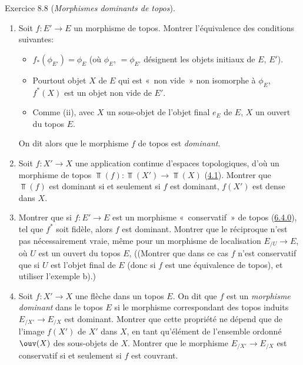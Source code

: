 \begin{enonce*}[remark]{Exercice 8.8}
(\emph{Morphismes dominants de topos}).
\begin{enumerate}
\renewcommand{\theenumi}{\alph{enumi}}
\renewcommand{\labelenumi}{\theenumi)}
\item Soit $f:E'\rightarrow E$ un morphisme de topos. Montrer
l'équivalence des conditions suivantes:

\begin{itemize}
\item[(i)] $f_{\ast}(\phi_{E'})=\phi_E$ (où $\phi_E$, $=\phi_{E'}$
désignent les objets initiaux de $E$, $E'$).

\item[(ii)] Pour\pageoriginale tout objet $X$ de $E$ qui est « non
vide »  \ie non isomorphe à $\phi_E$, $f^{\ast}(X)$ est un objet
non vide de $E'$.

\item[$\rm(ii')$] Comme (ii), avec $X$ un sous-objet de l'objet final
$e_E$ de $E$, \ie $X$ un ouvert du topos $E$.
\end{itemize}

On dit alors que le morphisme $f$ de topos est \emph{dominant}.

\item Soit $f:X'\rightarrow X$ une application continue d'espaces
topologiques, d'où un morphisme de topos
$\Top(f):\Top(X')\rightarrow \Top(X)$ (\hyperref[IV.subsec4.1]{4.1}). Montrer
que $\Top(f)$ est dominant si et seulement si $f$ est dominant, \ie
$f(X')$ est dense dans $X$.

\item Montrer que si $f:E'\rightarrow E$ est un morphisme « conservatif »  de topos (\hyperref[IV.subsubsec6.4.0]{6.4.0}), \ie tel que
$f^{\ast}$ soit fidèle, alors $f$ est dominant. Montrer que le
réciproque n'est pas nécessairement vraie, même pour un
morphisme de
localisation $E_{/U}\rightarrow E$, où $U$ est un ouvert du topos
$E$, ((Montrer que dans ce cas $f$ n'est conservatif que si $U$ est
l'objet final de $E$ (donc si $f$ est une équivalence de topos), et
utiliser l'exemple b).)

\item Soit $f:X'\rightarrow X$ une flèche dans un topos $E$. On dit
que $f$ est un \emph{morphisme dominant} dans le topos $E$ si le
morphisme correspondant des topos induits $E_{/X'}\rightarrow
E_{/X}$  est dominant. Montrer que cette
propriété ne
dépend que de l'image $f(X')$ de $X'$ dans $X$, en tant qu'élément
de l'ensemble ordonné $\ouv(X)$ des sous-objets de $X$. Montrer que
le morphisme $E_{/X'}\rightarrow E_{/X}$ est conservatif si et
seulement si $f$ est couvrant.
\end{enumerate}
\end{enonce*}

